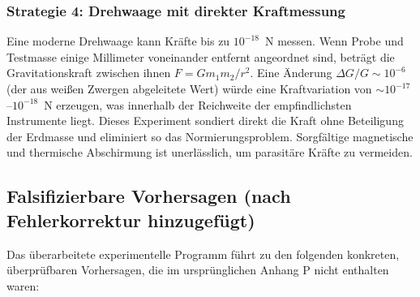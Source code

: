 \documentclass[12pt]{article}
\theoremstyle{remark}
\begin{document}
	\subsubsection*{Strategie 4: Drehwaage mit direkter Kraftmessung}
	Eine moderne Drehwaage kann Kräfte bis zu $10^{-18}$~N messen. Wenn Probe und Testmasse einige Millimeter voneinander entfernt angeordnet sind, beträgt die Gravitationskraft zwischen ihnen $F = G m_1 m_2 / r^2$. Eine Änderung $\Delta G / G \sim 10^{-6}$ (der aus weißen Zwergen abgeleitete Wert) würde eine Kraftvariation von $\sim 10^{-17}$–$10^{-18}$~N erzeugen, was innerhalb der Reichweite der empfindlichsten Instrumente liegt. Dieses Experiment sondiert direkt die Kraft ohne Beteiligung der Erdmasse und eliminiert so das Normierungsproblem. Sorgfältige magnetische und thermische Abschirmung ist unerlässlich, um parasitäre Kräfte zu vermeiden.
	
	\subsection{Falsifizierbare Vorhersagen (nach Fehlerkorrektur hinzugefügt)}
	\label{subsec:new-predictions}
	
	Das überarbeitete experimentelle Programm führt zu den folgenden konkreten, überprüfbaren Vorhersagen, die im ursprünglichen Anhang P nicht enthalten waren:
	
\end{document}
